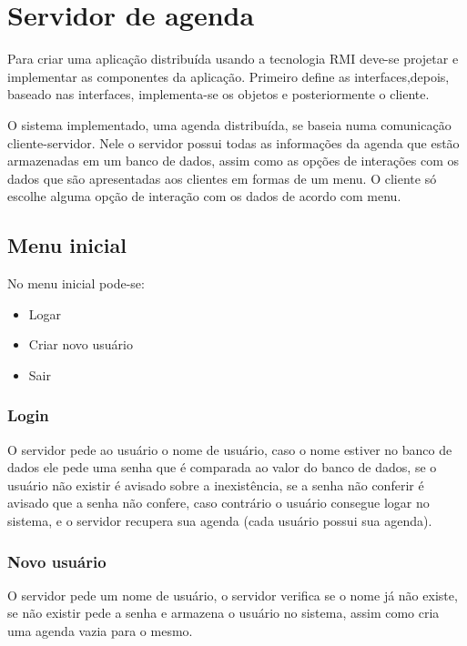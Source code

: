 \documentclass[10pt,a4paper]{article}
\begin{document}
\section{Servidor de agenda}
Para criar uma aplicação distribuída usando a tecnologia RMI deve-se
projetar e implementar as componentes da aplicação.
Primeiro define as interfaces,depois, baseado nas interfaces,
implementa-se os objetos e posteriormente o cliente.

O sistema implementado, uma agenda distribuída, se baseia numa comunicação
cliente-servidor. Nele o servidor possui todas as informações da
agenda que estão armazenadas em um banco de dados,
assim como as opções de interações com os dados que são apresentadas
aos clientes em formas de um menu.
O cliente só escolhe alguma opção de interação com os dados de
acordo com menu.


\subsection{Menu inicial}
No menu inicial pode-se:

\begin{itemize}
\item Logar
\item Criar novo usuário
\item Sair
\end{itemize}

\subsubsection{Login}
O servidor pede ao usuário o nome de usuário, caso o nome estiver no
banco de dados ele pede uma senha que é comparada ao valor do banco de
dados, se o usuário não existir é avisado sobre a inexistência, se a
senha não conferir é avisado que a senha não confere, caso contrário o
usuário consegue logar no sistema, e o servidor recupera sua agenda (cada
usuário possui sua agenda).


\subsubsection{Novo usuário}
O servidor pede um nome de usuário, o servidor verifica se o nome já
não existe, se não existir pede a senha e armazena o usuário no
sistema, assim como cria uma agenda vazia para o mesmo.
\end{document}
